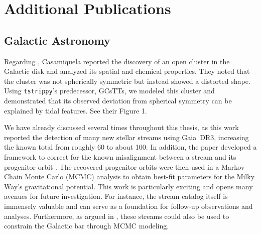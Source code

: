 \section{Additional Publications}
    \subsection*{Galactic Astronomy}

        Regarding \citet{2022A&A...664A..31C}, Casamiquela reported the discovery of an open cluster in the Galactic disk and analyzed its spatial and chemical properties. They noted that the cluster was not spherically symmetric but instead showed a distorted shape. Using \texttt{tstrippy}'s predecessor, GCsTTs, we modeled this cluster and demonstrated that its observed deviation from spherical symmetry can be explained by tidal features. See their Figure 1.

        We have already discussed \citet{2024ApJ...967...89I} several times throughout this thesis, as this work reported the detection of many new stellar streams using Gaia~DR3, increasing the known total from roughly 60 to about 100. In addition, the paper developed a framework to correct for the known misalignment between a stream and its progenitor orbit \citep{2007ApJ...659.1212M,2013MNRAS.433.1813S}. The recovered progenitor orbits were then used in a Markov Chain Monte Carlo (MCMC) analysis to obtain best-fit parameters for the Milky Way's gravitational potential. This work is particularly exciting and opens many avenues for future investigation. For instance, the stream catalog itself is immensely valuable and can serve as a foundation for follow-up observations and analyses. Furthermore, as argued in \citet{2023A&A...678A.180T}, these streams could also be used to constrain the Galactic bar through MCMC modeling.

